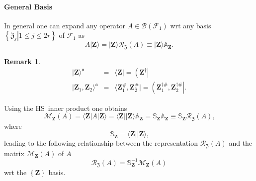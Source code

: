 \documentclass[aps, preprint]{revtex4}
\newtheorem{remark}[theorem]{Remark}
\begin{document}
\paragraph{General Basis}
In general one can expand any operator $A \in \mathcal{B} \left (\mathcal{F}_{1}\right )$ wrt any basis $\left \{\left .\mathfrak{Z}_{j}\right \vert 1 \leq j \leq 2 r\text{}\right \}$ of $\mathcal{F}_{1}$ as
\begin{equation}A\vert \mathbf{Z} \rangle  =\vert \mathbf{Z} \rangle \mathcal{R}_{\mathfrak{Z}} \left (A\right ) \equiv \vert \mathbf{Z} \rangle \mathbb{A}_{\mathbf{Z}}\text{.}
\end{equation}


\begin{remark}
\begin{align}\vert \mathbf{Z} \rangle ^{\mathfrak{a}} &  = &  \langle \mathbf{Z}\vert  =\left (\mathbf{Z}^{ \dag }\right \vert  \\
\vert \mathbf{Z}_{1} ,\mathbf{Z}_{2} \rangle ^{\mathfrak{a}} &  = &  \langle \mathbf{Z}_{1}^{\#} ,\mathbf{Z}_{2}^{\#}\vert  =\left (\mathbf{Z}_{1}^{ \dag \#} ,\mathbf{Z}_{2}^{ \dag \#}\right \vert \text{.}\end{align}
\end{remark}

Using the HS\ inner product one obtains
\begin{equation}\mathcal{M}_{\mathbf{Z}} \left (A\right ) = \langle \mathbf{Z}\vert A\vert \mathbf{Z} \rangle  = \langle \mathbf{Z}\vert \vert \mathbf{Z} \rangle \mathbb{A}_{\mathbf{Z}} =\mathbb{S}_{\mathbf{Z}} \mathbb{A}_{\mathbf{Z}} \equiv \mathbb{S}_{\mathbf{Z}} \mathcal{R}_{\mathfrak{Z}} \left (A\right )\text{,}
\end{equation}where
\begin{equation}\mathbb{S}_{\mathbf{Z}} = \langle \mathbf{Z}\vert \vert \mathbf{Z} \rangle \text{,}
\end{equation}leading to the following relationship between the representation $\mathcal{R}_{\mathfrak{Z}} \left (A\right )$ and the matrix $\mathcal{M}_{\mathbf{Z}} \left (A\right )$ of $A\;$
\begin{equation}\mathcal{R}_{\mathfrak{Z}} \left (A\right ) =\mathbb{S}_{\mathbf{Z}}^{ -1} \mathcal{M}_{\mathbf{Z}} \left (A\right )
\end{equation}wrt the $\left \{\mathbf{Z}\right \}$ basis. 
\end{document}

